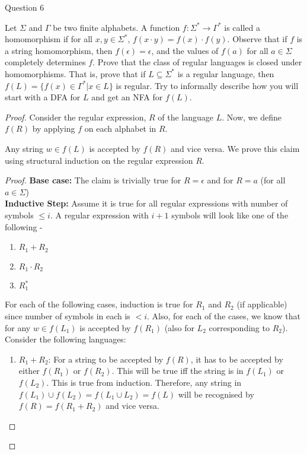 \begin{solution}{Question 6}\label{ques:6}
	\begin{question}
		Let $\Sigma$ and $\Gamma$ be two finite alphabets. A function $f: \Sigma^*\to\Gamma^*$ is called a homomorphism if for all $x, y\in \Sigma^*$, $f(x\cdot y) = f(x)\cdot f(y)$. Observe that if $f$ is a string homomorphism, then $f(\epsilon) = \epsilon$, and the values of $f(a)$ for all $a\in \Sigma$ completely determines $f$. Prove that the class of regular languages is closed under homomorphisms. That is, prove that if $L \subseteq \Sigma^*$ is a regular language, then $f(L) = \{f(x) \in \Gamma^* | x \in L\}$ is regular. Try to informally describe how you will start with a DFA for $L$ and get an NFA for $f(L)$.
	\end{question}
	\tcblower{}
	\begin{proof}
		Consider the regular expression, $R$ of the language $L$. Now, we define $f(R)$ by applying $f$ on each alphabet in $R$.
		\begin{claim}
			Any string $w\in f(L)$ is accepted by $f(R)$ and vice versa. We prove this claim using structural induction on the regular expression $R$.
		\end{claim}
		\begin{proof}
			\textbf{Base case:} The claim is trivially true for $R = \epsilon$ and for $R = a$ (for all $a \in \Sigma$)\\
			\textbf{Inductive Step:} Assume it is true for all regular expressions with number of symbols $\leq i$. A regular expression with $i+1$ symbols will look like one of the following -
			\begin{enumerate}
				\item $R_1 + R_2$
				\item $R_1 \cdot R_2$
				\item $R_1^*$
			\end{enumerate}
			For each of the following cases, induction is true for $R_1$ and $R_2$ (if applicable) since number of symbols in each is $< i$. Also, for each of the cases, we know that for any $w\in f(L_1)$ is accepted by $f(R_1)$ (also for $L_2$ corresponding to $R_2$). Consider the following languages:
			\begin{enumerate}
				\item $R_1 + R_2$: For a string to be accepted by $f(R)$, it has to be accepted by either $f(R_1)$ or $f(R_2)$. This will be true iff the string is in $f(L_1)$ or $f(L_2)$. This is true from induction. Therefore, any string in $f(L_1)\cup f(L_2) = f(L_1 \cup L_2) = f(L)$ will be recognised by $f(R) = f(R_1 + R_2)$ and vice versa.

\end{enumerate}
\end{proof}
\end{proof}
\end{solution}
